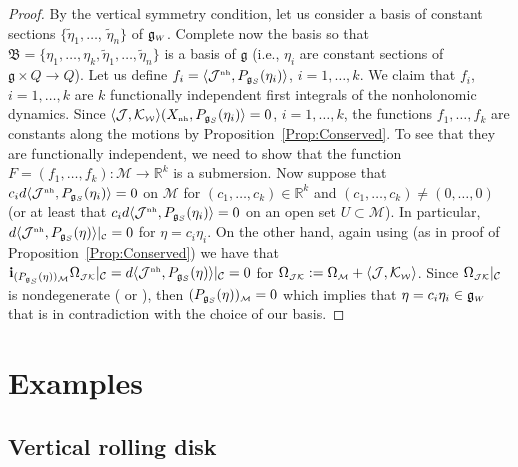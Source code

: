 \documentclass[pdftex]{sigma}
\numberwithin{equation}{section}
\def\W{\mathcal{W}}
\def\M{\mathcal{M}}
\def\J{\mathcal{J}}
\def\C{\mathcal{C}}
\def\R{\mathbb{R}}
\def\g{\mathfrak{g}}
\def\nh{{\mbox{\tiny{nh}}}}
\def\subW{{\mbox{\tiny{$\W$}}}}
\def\subC{{\mbox{\tiny{$\C$}}}}
\def\subM{{\mbox{\tiny{$\M$}}}}
\def\subWW{{\mbox{\tiny{$W$}}}}
\begin{document}
\begin{proof}
  By the vertical symmetry condition,  let us consider a basis of constant sections
  $\{\tilde \eta_1, \dots$, $\tilde \eta_n\}$ of $\g_\subWW$. Complete now the basis
  so that $\mathfrak{B} = \{\eta_1,\dots, \eta_k , \tilde \eta_1, \dots , \tilde \eta_n\}$
  is a basis of $\g$ (i.e., $\eta_i$ are constant sections of $\g\times Q\to Q$).
  Let us def\/ine $f_i = \langle \J^\nh, P_{\g_S}(\eta_i)\rangle$, $i=1,\ldots, k$.
  We claim that $f_i$, $i=1,\ldots, k$ are $k$ functionally independent f\/irst
  integrals of the nonholonomic dynamics.
  Since $\langle \J,\mathcal{K}_\subW\rangle(X_\nh, P_{\g_S}(\eta_i) \rangle = 0$, $i=1,\ldots, k$,
  the functions $f_1, \ldots, f_k$ are constants along the motions by Proposition~\ref{Prop:Conserved}.
  To see that they are functionally independent, we need to show that the function
  $F= (f_1,\dots , f_k)\colon \M\longrightarrow \R^k$ is a submersion. Now suppose that
  $c_i  d\langle \J^\nh , P_{\g_S}(\eta_i) \rangle = 0$ on $\M$ for $(c_1,\dots , c_k)\in\R^k$ and
  $(c_1,\ldots, c_k)\ne (0,\ldots, 0)$ (or at least that $c_i d\langle \J^\nh , P_{\g_S}(\eta_i)\rangle = 0$
  on an open set $U\subset \M$). In particular, $d\langle \J^\nh , P_{\g_S}(\eta)\rangle|_\subC = 0$ for $\eta= c_i  \eta_i$.
  On the other hand, again using \cite[Theorem~6.5(ii)]{Paula} (as in proof of Proposition~\ref{Prop:Conserved}) we have that ${\bf i}_{( P_{\mathfrak{g}_S}(\eta))_\subM} \Omega_{\mbox{\tiny{${\mathcal J} {\mathcal K}$}}} |_\C= d\langle \J^\nh , P_{\g_S}(\eta)\rangle|_\C = 0 $ for $\Omega_{\mbox{\tiny{${\mathcal J} {\mathcal K}$}}} := \Omega_\subM + \langle \mathcal{J},\mathcal{K}_\subW\rangle$.  Since $ \Omega_{\mbox{\tiny{${\mathcal J} {\mathcal K}$}}} |_\C$ is nondegenerate (\cite[Section~5.1]{Paula} or \cite[Proposition~3]{PL2011}), then $(P_{\g_S}(\eta))_\subM = 0$ which implies that $\eta = c_i  \eta_i\in \g_\subWW$ that is in contradiction with the choice of our basis.
\end{proof}


\section{Examples}\label{S:Examples}

\subsection{Vertical rolling disk}\label{Ex:Disk}
\end{document}
